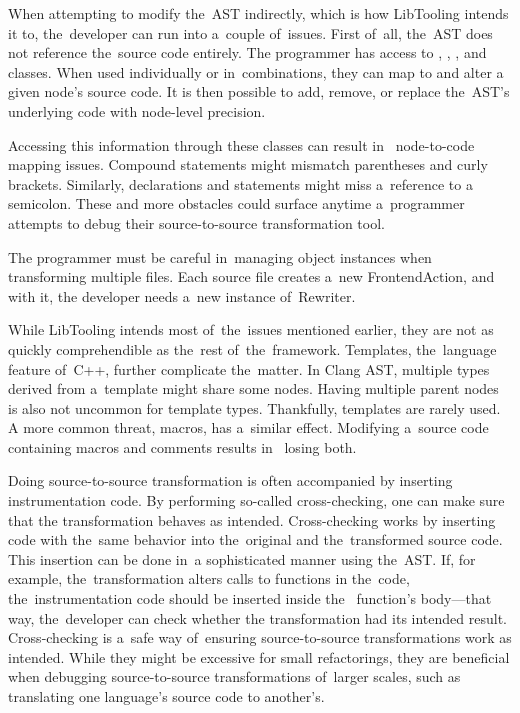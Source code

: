 When attempting to modify the~AST indirectly, which is how LibTooling 
intends it to, the~developer can run into a~couple of~issues. 
First of~all, the~AST does not reference the~source code entirely. 
The programmer has access to , ,
, and  classes. 
When used individually or in~combinations, they can map to and alter 
a given node's source code.
It is then possible to add, remove, or replace the~AST's underlying 
code with node-level precision.

Accessing this information through these classes can result in~
node-to-code mapping issues. 
Compound statements might mismatch parentheses and curly brackets. 
Similarly, declarations and statements might miss a~reference to 
a semicolon. 
These and more obstacles could surface anytime a~programmer attempts 
to debug their source-to-source transformation tool. 

The programmer must be careful in~managing object instances when 
transforming multiple files. 
Each source file creates a~new FrontendAction, and with it, 
the developer needs a~new instance of~Rewriter.

While LibTooling intends most of~the~issues mentioned earlier, 
they are not as quickly comprehendible as the~rest of~the~framework. 
Templates, the~language feature of~C++, further complicate the~matter. 
In Clang AST, multiple types derived from a~template might share some nodes. 
Having multiple parent nodes is also not uncommon for template types. 
Thankfully, templates are rarely used. 
A more common threat, macros, has a~similar effect. 
Modifying a~source code containing macros and comments results in~
losing both.

Doing source-to-source transformation is often accompanied by 
inserting instrumentation code. 
By performing so-called cross-checking, one can make sure that 
the transformation behaves as intended. 
Cross-checking works by inserting code with the~same behavior 
into the~original and the~transformed source code.  
This insertion can be done in~a sophisticated manner using the~AST. 
If, for example, the~transformation alters calls to functions 
in the~code, the~instrumentation code should be inserted inside the~
function's body—that way, the~developer can check whether 
the transformation had its intended result.
Cross-checking is a~safe way of~ensuring source-to-source 
transformations work as intended. 
While they might be excessive for small refactorings, 
they are beneficial when debugging source-to-source 
transformations of~larger scales, such as translating 
one language's source code to another's.
